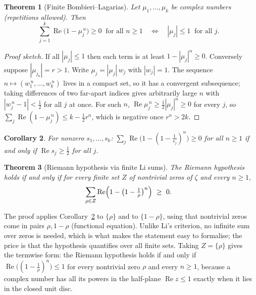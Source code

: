 \documentclass[11pt,a4paper]{article}
\newtheorem{theorem}{Theorem}
\newtheorem{corollary}[theorem]{Corollary}
\theoremstyle{remark}\newtheorem*{remark}{Remark}
\renewcommand{\Re}{\operatorname{Re}}
\begin{document}
\begin{theorem}[Finite Bombieri--Lagarias]\label{fli}
Let $\mu_1,\dots,\mu_k$ be complex numbers (repetitions allowed). Then
\[
  \sum_{j=1}^{k}\Re\bigl(1-\mu_j^{\,n}\bigr)\ge0\ \text{ for all } n\ge1
  \quad\Longleftrightarrow\quad |\mu_j|\le1\ \text{ for all } j .
\]
\end{theorem}

\begin{proof}[Proof sketch]
If all $|\mu_j|\le1$ then each term is at least $1-|\mu_j|^{n}\ge0$. Conversely suppose
$|\mu_{j_0}|=r>1$. Write $\mu_j=|\mu_j|\,w_j$ with $|w_j|=1$. The sequence
$n\mapsto(w_1^{\,n},\dots,w_k^{\,n})$ lives in a compact set, so it has a convergent
subsequence; taking differences of two far-apart indices gives arbitrarily large $n$
with $|w_j^{\,n}-1|<\tfrac12$ for all $j$ at once. For such $n$,
$\Re\mu_j^{\,n}\ge\tfrac12|\mu_j|^{n}\ge0$ for every $j$, so
$\sum_j\Re(1-\mu_j^{\,n})\le k-\tfrac12r^{n}$, which is negative once $r^{n}>2k$.
\end{proof}

\begin{corollary}\label{half}
For nonzero $s_1,\dots,s_k$:\quad
$\sum_j\Re\bigl(1-(1-\tfrac1{s_j})^{n}\bigr)\ge0$ for all $n\ge1$ if and only if
$\Re s_j\ge\tfrac12$ for all $j$.
\end{corollary}

\begin{theorem}[Riemann hypothesis via finite Li sums]\label{rhli}
The Riemann hypothesis holds if and only if for every finite set $Z$ of nontrivial
zeros of $\zeta$ and every $n\ge1$,
\[
  \sum_{\rho\in Z}\Re\Bigl(1-\bigl(1-\tfrac1\rho\bigr)^{n}\Bigr)\ \ge\ 0 .
\]
\end{theorem}

The proof applies Corollary~\ref{half} to $\{\rho\}$ and to $\{1-\rho\}$, using that
nontrivial zeros come in pairs $\rho,1-\rho$ (functional equation). Unlike Li's
criterion, no infinite sum over zeros is needed, which is what makes the statement
easy to formalise; the price is that the hypothesis quantifies over all finite sets. Taking $Z=\{\rho\}$ gives the termwise form: the Riemann hypothesis holds if and only if
$\Re\bigl((1-\tfrac1\rho)^{n}\bigr)\le1$ for every nontrivial zero $\rho$ and every $n\ge1$, because a
complex number has all its powers in the half-plane $\Re z\le1$ exactly when it lies in the closed
unit disc.
\end{document}
